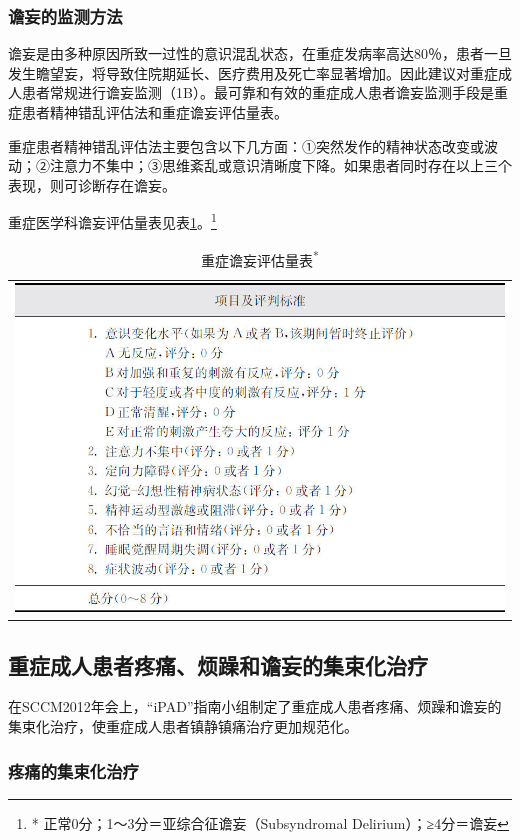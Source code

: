 \subsubsection{谵妄的监测方法}

谵妄是由多种原因所致一过性的意识混乱状态，在重症发病率高达80％，患者一旦发生瞻望妄，将导致住院期延长、医疗费用及死亡率显著增加。因此建议对重症成人患者常规进行谵妄监测（1B）。最可靠和有效的重症成人患者谵妄监测手段是重症患者精神错乱评估法和重症谵妄评估量表。

重症患者精神错乱评估法主要包含以下几方面：①突然发作的精神状态改变或波动；②注意力不集中；③思维紊乱或意识清晰度下降。如果患者同时存在以上三个表现，则可诊断存在谵妄。

重症医学科谵妄评估量表见表\ref{tabapp-12}。\footnote{* 正常0分；1～3分＝亚综合征谵妄（Subsyndromal Delirium）；≥4分＝谵妄}

\begin{longtable}{c}
  \caption{重症谵妄评估量表\textsuperscript{*}}
  \label{tabapp-12}
  \endfirsthead
  \caption[]{重症谵妄评估量表\textsuperscript{*}}
  \endhead
\includegraphics[width=\textwidth,height=\textheight,keepaspectratio]{./images/Image00312.jpg}
\end{longtable}

\subsection{重症成人患者疼痛、烦躁和谵妄的集束化治疗}

在SCCM2012年会上，“iPAD”指南小组制定了重症成人患者疼痛、烦躁和谵妄的集束化治疗，使重症成人患者镇静镇痛治疗更加规范化。

\subsubsection{疼痛的集束化治疗}

